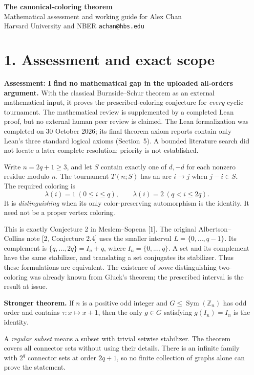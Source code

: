 \documentclass[11pt]{article}
\newcommand{\Z}{\mathbb Z}
\newcommand{\Sym}{\operatorname{Sym}}
\begin{document}
{\LARGE\bfseries The canonical-coloring theorem}\\[6pt]
{\large Mathematical assessment and working guide for Alex Chan}\\
Harvard University and NBER \quad \texttt{achan@hbs.edu}

\section*{1. Assessment and exact scope}
\textbf{Assessment: I find no mathematical gap in the uploaded all-orders
argument.} With the classical Burnside--Schur theorem as an external
mathematical input, it proves the prescribed-coloring conjecture for
\emph{every} cyclic tournament. The mathematical review is supplemented by a completed Lean proof,
but no external human peer review is claimed. The Lean formalization was
completed on 30 October 2026; its final theorem axiom reports contain
only Lean's three standard logical axioms (Section~5). A bounded
literature search did not locate a later complete resolution; priority
is not established.

Write $n=2q+1\geq3$, and let $S$ contain exactly one of $d,-d$ for each
nonzero residue modulo $n$. The tournament $T(n;S)$ has an arc $i\to j$
when $j-i\in S$. The required coloring is
\[
 \lambda(i)=1\ (0\leq i\leq q),\qquad
 \lambda(i)=2\ (q<i\leq2q).
\]
It is \emph{distinguishing} when its only color-preserving
automorphism is the identity. It need not be a proper vertex coloring.

This is exactly Conjecture 2 in Meslem--Sopena [1]. The original
Albertson--Collins note [2, Conjecture 2.4] uses the smaller interval
$L=\{0,\ldots,q-1\}$. Its complement is
$\{q,\ldots,2q\}=I_n+q$, where $I_n=\{0,\ldots,q\}$.
A set and its complement have the same stabilizer, and translating
a set conjugates its stabilizer. Thus these formulations are equivalent.
The existence of \emph{some} distinguishing two-coloring was already
known from Gluck's theorem; the prescribed interval is the result at issue.

\textbf{Stronger theorem.} If $n$ is a positive odd integer and
$G\leq\Sym(\Z_n)$ has odd order and contains $\tau:x\mapsto x+1$,
then the only $g\in G$ satisfying $g(I_n)=I_n$ is the identity.

A \emph{regular subset} means a subset with trivial setwise stabilizer.
The theorem covers all connector sets without using their details.
There is an infinite family with $2^q$ connector sets at order $2q+1$,
so no finite collection of graphs alone can prove the statement.
\end{document}
